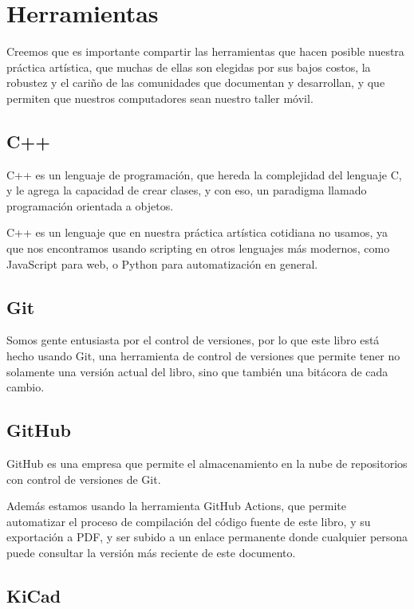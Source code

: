 \documentclass[../principal.tex]{subfiles}
\begin{document}
\chapter{Herramientas}

Creemos que es importante compartir las herramientas que hacen posible nuestra práctica artística, que muchas de ellas son elegidas por sus bajos costos, la robustez y el cariño de las comunidades que documentan y desarrollan, y que permiten que nuestros computadores sean nuestro taller móvil.

\section{C++}

C++ es un lenguaje de programación, que hereda la complejidad del lenguaje C, y le agrega la capacidad de crear clases, y con eso, un paradigma llamado programación orientada a objetos. 

C++ es un lenguaje que en nuestra práctica artística cotidiana no usamos, ya que nos encontramos usando scripting en otros lenguajes más modernos, como JavaScript para web, o Python para automatización en general.

\section{Git}

Somos gente entusiasta por el control de versiones, por lo que este libro está hecho usando Git, una herramienta de control de versiones que permite tener no solamente una versión actual del libro, sino que también una bitácora de cada cambio.

\section{GitHub}

GitHub es una empresa que permite el almacenamiento en la nube de repositorios con control de versiones de Git.

Además estamos usando la herramienta GitHub Actions, que permite automatizar el proceso de compilación del código fuente de este libro, y su exportación a PDF, y ser subido a un enlace permanente donde cualquier persona puede consultar la versión más reciente de este documento.

\section{KiCad}
\end{document}
